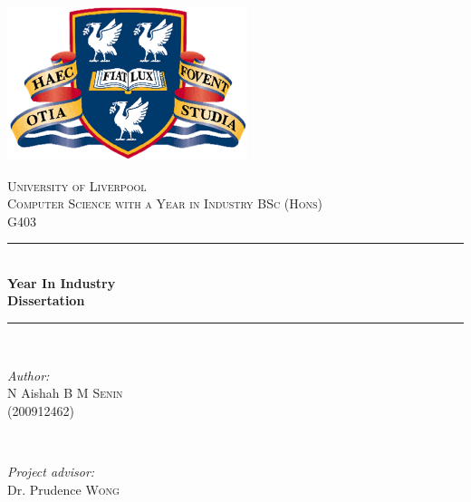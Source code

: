\documentclass[12pt,a4paper,oneside]{report}
\begin{document}

\begin{titlepage}
\newcommand{\HRule}{\rule{\linewidth}{0.5mm}} 
\center 
 

\includegraphics[width=7cm]{images/logo/uol.png}

\vfill

\textsc{\LARGE University of Liverpool}\\[1.5cm] 
\textsc{\large Computer Science with a Year in Industry BSc (Hons)}\\[0.5cm] 
\textsc{\large G403}\\[0.5cm] 


\HRule \\[0.4cm]
{ \huge \bfseries Year In Industry \\ Dissertation}\\[0.4cm] %
\HRule \\[1.5cm]
 

\begin{minipage}{0.4\textwidth}
\begin{flushleft} \large
\emph{Author:}\\
N Aishah B M \textsc{Senin} \\ (200912462) %
\end{flushleft}
\end{minipage}
~
\begin{minipage}{0.4\textwidth}
\begin{flushright} \large
\emph{Project advisor:} \\
Dr. Prudence \textsc{Wong} %
\end{flushright}
\end{minipage}\\[4cm]


\end{titlepage}
\end{document}
